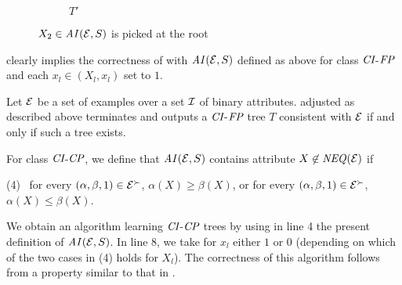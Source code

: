 \begin{figure}
\begin{subfigure}[b]{0.45\textwidth}
		\caption{$T'$ \label{fig:promote_T_updated}}
	\end{subfigure}
	\caption{$X_2 \in \mathit{AI}(\mathcal{E},S)$ is picked at the root \label{fig:promote}}
\end{figure}

 clearly implies the correctness of  with 
$\mathit{AI}(\mathcal{E},S)$ defined as above for class $\textit{CI}$-$\textit{FP}$ and each $x_l \in 
(X_l,x_l)$ set to $1$.

\begin{thm}
Let $\mathcal{E}$ be a set of examples over a set $\mathcal{I}$ of binary attributes.
 adjusted as described above terminates and outputs
a $\textit{CI}$-$\textit{FP}$ tree $T$ consistent with $\mathcal{E}$ if
and only if such a tree exists.
\end{thm}


For class $\textit{CI}$-$\textit{CP}$, we define that $\mathit{AI}(\mathcal{E},S)$ contains attribute $X \not \in \mathit{NEQ}(\mathcal{E})$ if 

\noindent (4) \ for every $(\alpha,\beta,1) \in \mathcal{E}^\succ$, $\alpha(X) \geq 
\beta(X)$, or for every $(\alpha,\beta,1) \in \mathcal{E}^\succ$, $\alpha(X) \leq \beta(X)$.

We obtain an algorithm learning $\textit{CI}$-$\textit{CP}$ trees by using in line 4
the present definition of $\mathit{AI}(\mathcal{E},S)$. In line 8, we take for 
$x_l$ either $1$ or $0$ (depending on which of the two
cases in (4) holds for $X_l$).
The correctness of this algorithm follows from a property similar to
that in .


